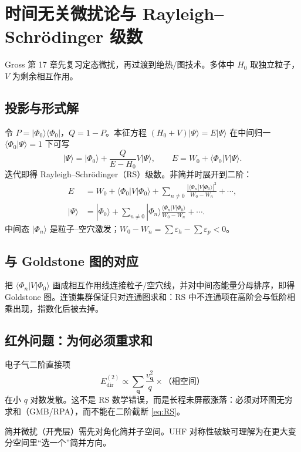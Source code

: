 \section{时间无关微扰论与 Rayleigh--Schr\"odinger 级数}

Gross 第 17 章先复习定态微扰，再过渡到绝热/图技术。多体中 $H_0$ 取独立粒子，$V$ 为剩余相互作用。

\subsection{投影与形式解}

令 $P=|\Phi_0\rangle\langle\Phi_0|$，$Q=1-P$。本征方程 $(H_0+V)|\Psi\rangle=E|\Psi\rangle$ 在中间归一 $\langle\Phi_0|\Psi\rangle=1$ 下可写
\begin{equation}
  |\Psi\rangle
  =|\Phi_0\rangle
  +\frac{Q}{E-H_0}V|\Psi\rangle,
  \qquad
  E
  =W_0+\langle\Phi_0|V|\Psi\rangle.
\end{equation}
迭代即得 Rayleigh--Schr\"odinger（RS）级数。非简并时展开到二阶：
\begin{equation}
\begin{aligned}
  E
  &=W_0
  +\langle\Phi_0|V|\Phi_0\rangle
  +\sum_{n\neq0}
  \frac{|\langle\Phi_n|V|\Phi_0\rangle|^2}{W_0-W_n}
  +\cdots,\\
  |\Psi\rangle
  &=|\Phi_0\rangle
  +\sum_{n\neq0}
  |\Phi_n\rangle
  \frac{\langle\Phi_n|V|\Phi_0\rangle}{W_0-W_n}
  +\cdots.
\end{aligned}
\label{eq:RS}
\end{equation}
中间态 $|\Phi_n\rangle$ 是粒子--空穴激发；$W_0-W_n=\sum\varepsilon_h-\sum\varepsilon_p<0$。

\subsection{与 Goldstone 图的对应}

把 $\langle\Phi_n|V|\Phi_0\rangle$ 画成相互作用线连接粒子/空穴线，并对中间态能量分母排序，即得 Goldstone 图。连锁集群保证只对连通图求和：RS 中不连通项在高阶会与低阶相乘出现，指数化后被去掉。

\subsection{红外问题：为何必须重求和}

电子气二阶直接项
\begin{equation}
  E^{(2)}_{\mathrm{dir}}
  \propto
  \sum_{\mathbf{q}}
  \frac{v_{\mathbf{q}}^2}{q}
  \times\text{（相空间）}
\end{equation}
在小 $q$ 对数发散。这不是 RS 数学错误，而是长程未屏蔽涨落：必须对环图无穷求和（GMB/RPA），而不能在二阶截断 \eqref{eq:RS}。

\begin{note}
简并微扰（开壳层）需先对角化简并子空间。UHF 对称性破缺可理解为在更大变分空间里“选一个”简并方向。
\end{note}
